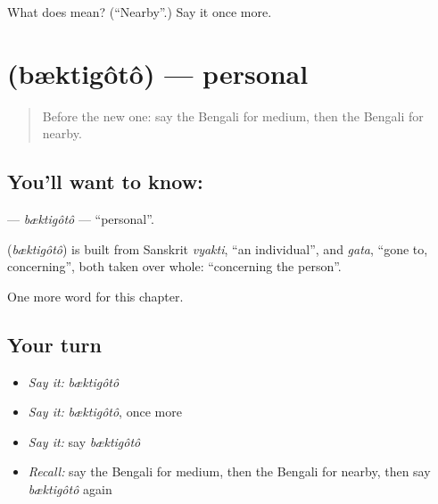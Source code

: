 \begin{tcolorbox}[breakable,colback=teal!4,colframe=teal!35!black,title={Before you move on}]
What does  mean? (\textquotedblleft{}Nearby\textquotedblright{}.) Say it once more.
\end{tcolorbox}
\section[\texorpdfstring{\bn{ব্যক্তিগত} (bæktigôtô)}{ব্যক্তিগত (bæktigôtô)}]{ (bæktigôtô) — personal}

\label{lesson:BN-C193-bktigoto}



\begin{quote}
Before the new one: say the Bengali for medium, then the Bengali for nearby.
\end{quote}

\subsection*{You'll want to know: }
\textbf{} — \emph{bæktigôtô} — \textquotedblleft{}personal\textquotedblright{}.

\begin{cousinweb}
\textbf{} (\emph{bæktigôtô}) is built from Sanskrit \emph{vyakti}, \textquotedblleft{}an individual\textquotedblright{}, and \emph{gata}, \textquotedblleft{}gone to, concerning\textquotedblright{}, both taken over whole: \textquotedblleft{}concerning the person\textquotedblright{}.
\end{cousinweb}

\begin{grammarlens}[title={What you've built}]
One more word for this chapter.
\end{grammarlens}

\subsection*{Your turn}
\begin{itemize}
\raggedright
  \item \emph{Say it:} \emph{bæktigôtô}
  \item \emph{Say it:} \emph{bæktigôtô}, once more
  \item \emph{Say it:} say \emph{bæktigôtô}
  \item \emph{Recall:} say the Bengali for medium, then the Bengali for nearby, then say \emph{bæktigôtô} again
\end{itemize}

